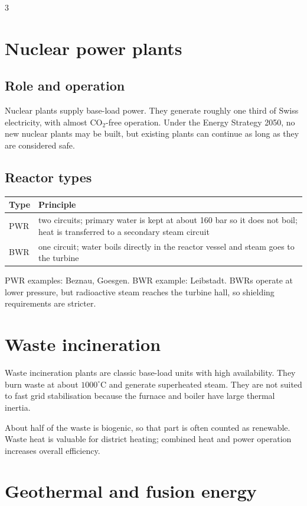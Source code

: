 \documentclass[9pt, landscape, a4paper]{article}
\begin{document}
\begin{multicols*}{3}
\section{Nuclear power plants}
\subsection{Role and operation}
Nuclear plants supply base-load power. They generate roughly one third of Swiss
electricity, with almost CO$_2$-free operation. Under the Energy Strategy
2050, no new nuclear plants may be built, but existing plants can continue as
long as they are considered safe.

\subsection{Reactor types}
\begin{tabularx}{\columnwidth}{@{}lX@{}}
  \toprule
  \textbf{Type} & \textbf{Principle}\\
  \midrule
  PWR & two circuits; primary water is kept at about 160 bar so it does not boil; heat is transferred to a secondary steam circuit\\
  BWR & one circuit; water boils directly in the reactor vessel and steam goes to the turbine\\
  \bottomrule
\end{tabularx}
PWR examples: Beznau, Goesgen. BWR example: Leibstadt. BWRs operate at lower
pressure, but radioactive steam reaches the turbine hall, so shielding
requirements are stricter.

\section{Waste incineration}
Waste incineration plants are classic base-load units with high availability.
They burn waste at about $1000^\circ$C and generate superheated steam. They are
not suited to fast grid stabilisation because the furnace and boiler have large
thermal inertia.

About half of the waste is biogenic, so that part is often counted as
renewable. Waste heat is valuable for district heating; combined heat and power
operation increases overall efficiency.

\section{Geothermal and fusion energy}

\end{multicols*}
\end{document}
